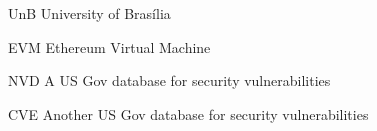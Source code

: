 \begin{siglas}

\item [UnB] University of Brasília
\item [EVM] Ethereum Virtual Machine
\item [NVD] A US Gov database for security vulnerabilities
\item [CVE] Another US Gov database for security vulnerabilities


\end{siglas}